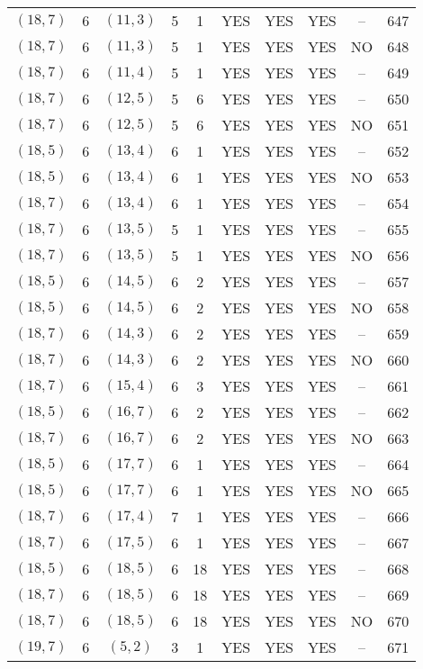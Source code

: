 \begin{longtable}{|c|c|c|c|c|c|c|c|c|c|}
$(18, 7)$ & 6 & $(11, 3)$ & 5 & 1 & YES & YES & YES & -- & 647\\
$(18, 7)$ & 6 & $(11, 3)$ & 5 & 1 & YES & YES & YES & NO & 648\\
$(18, 7)$ & 6 & $(11, 4)$ & 5 & 1 & YES & YES & YES & -- & 649\\
$(18, 7)$ & 6 & $(12, 5)$ & 5 & 6 & YES & YES & YES & -- & 650\\
$(18, 7)$ & 6 & $(12, 5)$ & 5 & 6 & YES & YES & YES & NO & 651\\
$(18, 5)$ & 6 & $(13, 4)$ & 6 & 1 & YES & YES & YES & -- & 652\\
$(18, 5)$ & 6 & $(13, 4)$ & 6 & 1 & YES & YES & YES & NO & 653\\
$(18, 7)$ & 6 & $(13, 4)$ & 6 & 1 & YES & YES & YES & -- & 654\\
$(18, 7)$ & 6 & $(13, 5)$ & 5 & 1 & YES & YES & YES & -- & 655\\
$(18, 7)$ & 6 & $(13, 5)$ & 5 & 1 & YES & YES & YES & NO & 656\\
$(18, 5)$ & 6 & $(14, 5)$ & 6 & 2 & YES & YES & YES & -- & 657\\
$(18, 5)$ & 6 & $(14, 5)$ & 6 & 2 & YES & YES & YES & NO & 658\\
$(18, 7)$ & 6 & $(14, 3)$ & 6 & 2 & YES & YES & YES & -- & 659\\
$(18, 7)$ & 6 & $(14, 3)$ & 6 & 2 & YES & YES & YES & NO & 660\\
$(18, 7)$ & 6 & $(15, 4)$ & 6 & 3 & YES & YES & YES & -- & 661\\
$(18, 5)$ & 6 & $(16, 7)$ & 6 & 2 & YES & YES & YES & -- & 662\\
$(18, 7)$ & 6 & $(16, 7)$ & 6 & 2 & YES & YES & YES & NO & 663\\
$(18, 5)$ & 6 & $(17, 7)$ & 6 & 1 & YES & YES & YES & -- & 664\\
$(18, 5)$ & 6 & $(17, 7)$ & 6 & 1 & YES & YES & YES & NO & 665\\
$(18, 7)$ & 6 & $(17, 4)$ & 7 & 1 & YES & YES & YES & -- & 666\\
$(18, 7)$ & 6 & $(17, 5)$ & 6 & 1 & YES & YES & YES & -- & 667\\
$(18, 5)$ & 6 & $(18, 5)$ & 6 & 18 & YES & YES & YES & -- & 668\\
$(18, 7)$ & 6 & $(18, 5)$ & 6 & 18 & YES & YES & YES & -- & 669\\
$(18, 7)$ & 6 & $(18, 5)$ & 6 & 18 & YES & YES & YES & NO & 670\\
$(19, 7)$ & 6 & $(5, 2)$ & 3 & 1 & YES & YES & YES & -- & 671\\

\end{longtable}
